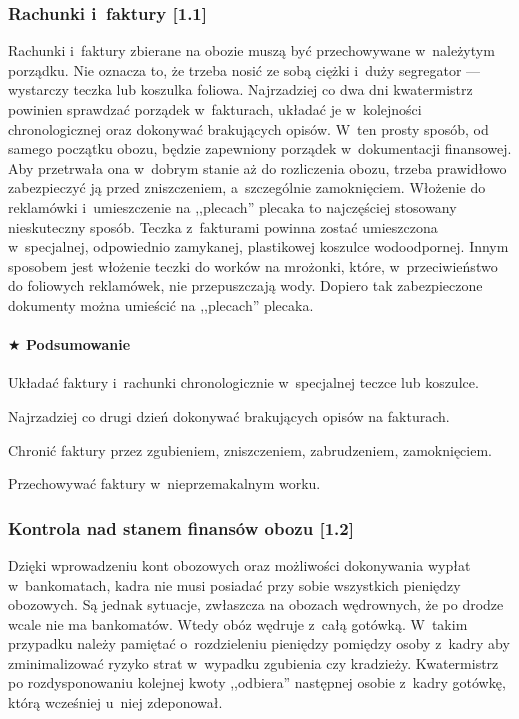 \documentclass[a5paper,10pt,titlepage,twoside]{article}
\newcommand*{\thecheckbox}{\hss$\Box$} %
\newenvironment*{checklist}
{\list{}{%
\renewcommand*{\makelabel}[1]{\thecheckbox}}}
{\endlist}
\begin{document}
\subsubsection{Rachunki i~faktury [1.1]}\label{rachunki-i-faktury}
Rachunki i~faktury zbierane na obozie muszą być przechowywane w~należytym porządku. Nie oznacza to, że trzeba nosić ze sobą ciężki i~duży segregator --- wystarczy teczka lub koszulka foliowa. Najrzadziej co dwa dni kwatermistrz powinien sprawdzać porządek w~fakturach, układać je w~kolejności chronologicznej oraz dokonywać brakujących opisów. W~ten prosty sposób, od samego początku obozu, będzie zapewniony porządek w~dokumentacji finansowej. Aby przetrwała ona w~dobrym stanie aż do rozliczenia obozu, trzeba prawidłowo zabezpieczyć ją przed zniszczeniem, a~szczególnie zamoknięciem. Włożenie do reklamówki i~umieszczenie na ,,plecach'' plecaka to najczęściej stosowany nieskuteczny sposób. Teczka z~fakturami powinna zostać umieszczona w~specjalnej, odpowiednio zamykanej, plastikowej koszulce wodoodpornej. Innym sposobem jest włożenie teczki do worków na mrożonki, które, w~przeciwieństwo do foliowych reklamówek, nie przepuszczają wody. Dopiero tak zabezpieczone dokumenty można umieścić na ,,plecach'' plecaka.
\paragraph{$\bigstar$ Podsumowanie}
\begin{checklist}
\item Układać faktury i~rachunki chronologicznie w~specjalnej teczce lub koszulce.
\item Najrzadziej co drugi dzień dokonywać brakujących opisów na fakturach.
\item Chronić faktury przez zgubieniem, zniszczeniem, zabrudzeniem, zamoknięciem.
\item Przechowywać faktury w~nieprzemakalnym worku.
\end{checklist}
\subsubsection{Kontrola nad stanem finansów obozu [1.2]}
Dzięki wprowadzeniu kont obozowych oraz możliwości dokonywania wypłat w~bankomatach, kadra nie musi posiadać przy sobie wszystkich pieniędzy obozowych. Są jednak sytuacje, zwłaszcza na obozach wędrownych, że po drodze wcale nie ma bankomatów. Wtedy obóz wędruje z~całą gotówką. W~takim przypadku należy pamiętać o~rozdzieleniu pieniędzy pomiędzy osoby z~kadry aby zminimalizować ryzyko strat w~wypadku zgubienia czy kradzieży. Kwatermistrz po rozdysponowaniu kolejnej kwoty ,,odbiera'' następnej osobie z~kadry gotówkę, którą wcześniej u~niej zdeponował.
\end{document}
